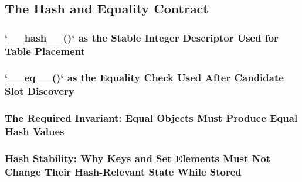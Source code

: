 \subsection{The Hash and Equality Contract}
\subsubsection{`__hash__()` as the Stable Integer Descriptor Used for Table Placement}
\subsubsection{`__eq__()` as the Equality Check Used After Candidate Slot Discovery}
\subsubsection{The Required Invariant: Equal Objects Must Produce Equal Hash Values}
\subsubsection{Hash Stability: Why Keys and Set Elements Must Not Change Their Hash-Relevant State While Stored}
